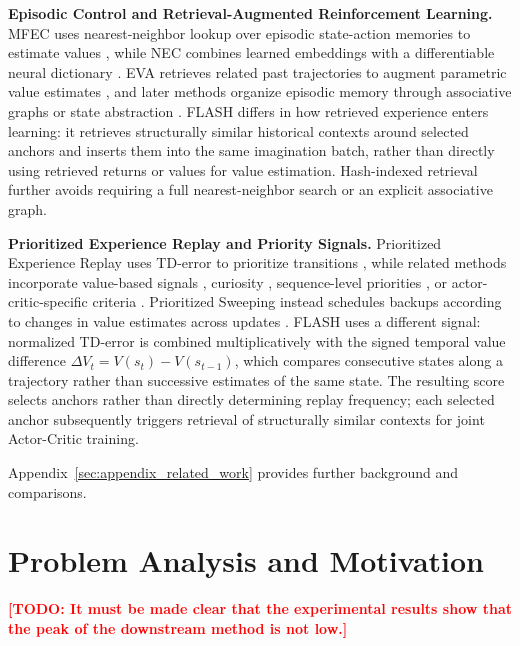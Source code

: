 \documentclass{article} %
\newcommand{\todo}[1]{\textcolor{red}{\textbf{[TODO: #1]}}}
\begin{document}
\textbf{Episodic Control and Retrieval-Augmented Reinforcement Learning.}
MFEC uses nearest-neighbor lookup over episodic state-action memories to estimate values \citep{blundell2016model}, while NEC combines learned embeddings with a differentiable neural dictionary \citep{pritzel2017neural}. EVA retrieves related past trajectories to augment parametric value estimates \citep{hansen2018fast}, and later methods organize episodic memory through associative graphs or state abstraction \citep{zhu2020episodic, li2023neural}. FLASH differs in how retrieved experience enters learning: it retrieves structurally similar historical contexts around selected anchors and inserts them into the same imagination batch, rather than directly using retrieved returns or values for value estimation. Hash-indexed retrieval further avoids requiring a full nearest-neighbor search or an explicit associative graph.

\textbf{Prioritized Experience Replay and Priority Signals.}
Prioritized Experience Replay uses TD-error to prioritize transitions \citep{schaul2015prioritized}, while related methods incorporate value-based signals \citep{cao2019high}, curiosity \citep{kauvar2023curious}, sequence-level priorities \citep{karimpanal2018experience, brittain2019prioritized}, or actor-critic-specific criteria \citep{saglam2023actor}. Prioritized Sweeping instead schedules backups according to changes in value estimates across updates \citep{moore1993prioritized}. FLASH uses a different signal: normalized TD-error is combined multiplicatively with the signed temporal value difference $\Delta V_t = V(s_t)-V(s_{t-1})$, which compares consecutive states along a trajectory rather than successive estimates of the same state. The resulting score selects anchors rather than directly determining replay frequency; each selected anchor subsequently triggers retrieval of structurally similar contexts for joint Actor-Critic training.

Appendix~\ref{sec:appendix_related_work} provides further background and comparisons.


\section{Problem Analysis and Motivation}
\label{sec:representation}

\todo{It must be made clear that the experimental results show that the peak of the downstream method is not low.}
\end{document}
